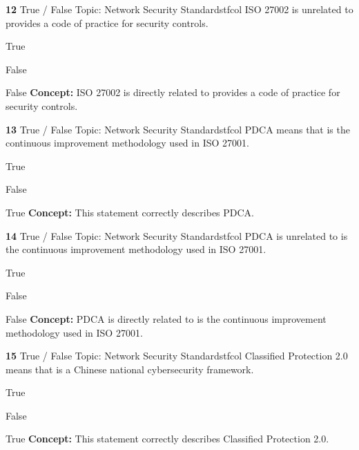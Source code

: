 \documentclass[10pt,a4paper]{article}
\begin{document}
\begin{qcard}{\color{white}\textbf{12} \hfill \small True / False \textbar{} Topic: Network Security Standards}{tfcol}
ISO 27002 is unrelated to provides a code of practice for security controls.

\begin{qoptions}
\item True
\item False
\end{qoptions}
\begin{explainbox}{False}
\textbf{Concept:} ISO 27002 is directly related to provides a code of practice for security controls.
\end{explainbox}
\end{qcard}

\begin{qcard}{\color{white}\textbf{13} \hfill \small True / False \textbar{} Topic: Network Security Standards}{tfcol}
PDCA means that is the continuous improvement methodology used in ISO 27001.

\begin{qoptions}
\item True
\item False
\end{qoptions}
\begin{explainbox}{True}
\textbf{Concept:} This statement correctly describes PDCA.
\end{explainbox}
\end{qcard}

\begin{qcard}{\color{white}\textbf{14} \hfill \small True / False \textbar{} Topic: Network Security Standards}{tfcol}
PDCA is unrelated to is the continuous improvement methodology used in ISO 27001.

\begin{qoptions}
\item True
\item False
\end{qoptions}
\begin{explainbox}{False}
\textbf{Concept:} PDCA is directly related to is the continuous improvement methodology used in ISO 27001.
\end{explainbox}
\end{qcard}

\begin{qcard}{\color{white}\textbf{15} \hfill \small True / False \textbar{} Topic: Network Security Standards}{tfcol}
Classified Protection 2.0 means that is a Chinese national cybersecurity framework.

\begin{qoptions}
\item True
\item False
\end{qoptions}
\begin{explainbox}{True}
\textbf{Concept:} This statement correctly describes Classified Protection 2.0.
\end{explainbox}
\end{qcard}
\end{document}
